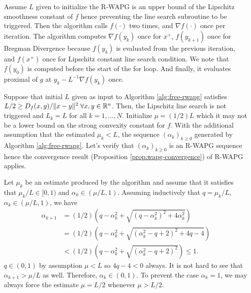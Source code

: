 \documentclass[12pt]{article}
\begin{document}
    Assume $L$ given to initialize the R-WAPG is an upper bound of the Lipschitz smoothness constant of $f$ hence preventing the line search subroutine to be triggered.
    Then the algorithm calls $f(\cdot)$ two times, and $\nabla f(\cdot)$ once per iteration.
    The algorithm computes $\nabla f(y_k)$ once for $x^+$, $f(y_{k + 1})$ once for Bregman Divergence because $f(y_{k})$ is evaluated from the previous iteration, and $f(x^+)$ once for Lipschitz constant line search condition.
    We note that $f(y_0)$ is computed before the start of the for loop.
    And finally, it evaluates proximal of $g$ at $y_k - L^{-1}\nabla f(y_k)$ once.
    \par
    Suppose that initial $L$ given as input to Algorithm \ref{alg:free-rwapg} satisfies $L/2 \ge D_f(x, y)/\Vert x - y\Vert^2\;\forall x, y \in \mathbb R^n$.
    Then, the Lipschitz line search is not triggered and $L_k = L$ for all $k = 1, \ldots, N$.
    Initialize $\mu = (1/2)L$ which it may not be a lower bound on the strong convexity constant for $f$.
    With the additional assumption that the estimated $\mu_k < L$, the sequence $(\alpha_k)_{k \ge 0}$ generated by Algorithm \ref{alg:free-rwapg}.
    Let's verify that $(\alpha_k)_{k \ge 0}$ is an R-WAPG sequence hence the convergence result (Proposition \ref{prop:wapg-convergence}) of R-WAPG applies.
    \par
    Let $\mu_k$ be an estimate produced by the algorithm and assume that it satisfies that $\mu_k/ L \in [0, 1)$ and $\alpha_k \in (\mu/L, 1)$.
    Assuming inductively that $q = \mu_k/L$,  $\alpha_k \in (\mu/L, 1)$, we have
    \begin{align*}
        \alpha_{k + 1}
        &=
        (1/2)\left(
            q - \alpha_k^2 + \sqrt{(q - \alpha_k^2)^2 + 4 \alpha_k^2}
        \right)
        \\
        &=
        (1/2)\left(
            q - \alpha_k^2 + \sqrt{
                (\alpha_k^2 - q + 2)^2 + 4q - 4
            }
        \right)
        \\
        &<
        (1/2)\left(
            q - \alpha_k^2 + \sqrt{
                (\alpha_k^2 - q + 2)^2
            }
        \right) \le 1.
    \end{align*}
    $q \in (0, 1)$ by assumption $\mu < L$ so $4q - 4 < 0$ always.
    It is not hard to see that $\alpha_{k + 1} > \mu/L$ as well.
    Therefore, $\alpha_k \in (0, 1)$.
    To prevent the case $\alpha_k = 1$, we may always force the estimate $\mu = L/2$ whenever $\mu > L/2$.
\end{document}

